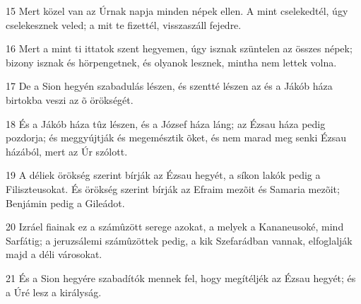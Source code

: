 \par 15 Mert közel van az Úrnak napja minden népek ellen. A mint cselekedtél, úgy cselekesznek veled; a mit te fizettél, visszaszáll fejedre.
\par 16 Mert a mint ti ittatok szent hegyemen, úgy isznak szüntelen az összes népek; bizony isznak és hörpengetnek, és olyanok lesznek, mintha nem lettek volna.
\par 17 De a Sion hegyén szabadulás lészen, és szentté lészen az és a Jákób háza birtokba veszi az õ örökségét.
\par 18 És a Jákób háza tûz lészen, és a József háza láng; az Ézsau háza pedig pozdorja; és meggyújtják és megemésztik õket, és nem marad meg senki Ézsau házából, mert az Úr szólott.
\par 19 A déliek örökség szerint bírják az Ézsau hegyét, a síkon lakók pedig a Filiszteusokat. És örökség szerint bírják az Efraim mezõit és Samaria mezõit; Benjámin pedig a Gileádot.
\par 20 Izráel fiainak ez a számûzött serege azokat, a melyek a Kananeusoké, mind Sarfátig; a jeruzsálemi számûzöttek pedig, a kik Szefarádban vannak, elfoglalják majd a déli városokat.
\par 21 És a Sion hegyére szabadítók mennek fel, hogy megítéljék az Ézsau hegyét; és a Úré lesz a királyság.


